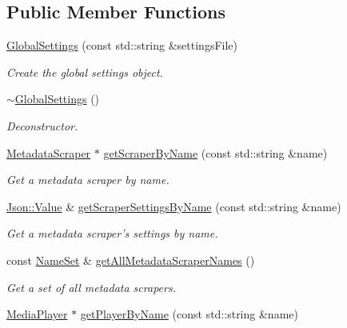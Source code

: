 \subsection*{Public Member Functions}
\begin{DoxyCompactItemize}
\item 
\hyperlink{class_a_w_e_1_1_global_settings_a8aa60ae622af94d79cba5321fb0a2816}{Global\-Settings} (const std\-::string \&settings\-File)
\begin{DoxyCompactList}\small\item\em Create the global settings object. \end{DoxyCompactList}\item 
\hyperlink{class_a_w_e_1_1_global_settings_ad3e8fa5120473c6c0151573ad81e1b04}{$\sim$\-Global\-Settings} ()
\begin{DoxyCompactList}\small\item\em Deconstructor. \end{DoxyCompactList}\item 
\hyperlink{class_a_w_e_1_1_metadata_scraper}{Metadata\-Scraper} $\ast$ \hyperlink{class_a_w_e_1_1_global_settings_a40bfab45d901e7c1acdd2d0a8700fd69}{get\-Scraper\-By\-Name} (const std\-::string \&name)
\begin{DoxyCompactList}\small\item\em Get a metadata scraper by name. \end{DoxyCompactList}\item 
\hyperlink{class_json_1_1_value}{Json\-::\-Value} \& \hyperlink{class_a_w_e_1_1_global_settings_a45d865b8b7242f17ad6e83ff014ee4c6}{get\-Scraper\-Settings\-By\-Name} (const std\-::string \&name)
\begin{DoxyCompactList}\small\item\em Get a metadata scraper's settings by name. \end{DoxyCompactList}\item 
const \hyperlink{class_a_w_e_1_1_global_settings_a45df15954e36fb1bad5385f5249c408e}{Name\-Set} \& \hyperlink{class_a_w_e_1_1_global_settings_ac1824eeb7c6319dda29aa061dd13184c}{get\-All\-Metadata\-Scraper\-Names} ()
\begin{DoxyCompactList}\small\item\em Get a set of all metadata scrapers. \end{DoxyCompactList}\item 
\hyperlink{class_a_w_e_1_1_media_player}{Media\-Player} $\ast$ \hyperlink{class_a_w_e_1_1_global_settings_ae2cc7da9b20e508de12f472ba86cf351}{get\-Player\-By\-Name} (const std\-::string \&name)

\end{DoxyCompactItemize}
